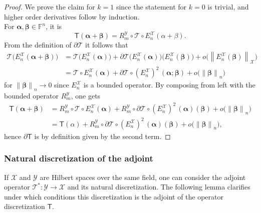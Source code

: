 \documentclass[a4paper]{paper}
\newcommand{\Spc}[1]{\mathscr{#1}}
\newcommand{\Field}{\mathbb{F}}
\newcommand{\Op}[1]{\mathcal{#1}}
\newcommand{\DiscOp}[1]{\mathsf{#1}}
\newcommand*{\EXT}[2]{\ensuremath{E_{#1}^{#2}}}
\newcommand*{\REST}[2]{\ensuremath{R_{#1}^{#2}}}
\newcommand*{\RmY}{\ensuremath{\REST{m}{\Spc{Y}}}}
\newcommand*{\EnX}{\ensuremath{\EXT{n}{\Spc{X}}}}
\newcommand*{\NORM}[1]{\ensuremath{\lVert #1 \rVert}}
\newcommand*{\NORMLR}[1]{\ensuremath{\left\lVert #1 \right\rVert}}
\newcommand{\valpha}{\boldsymbol{\alpha}}
\newcommand{\vbeta}{\boldsymbol{\beta}}
\begin{document}
\begin{proof}
 We prove the claim for $k=1$ since the statement for $k=0$ is trivial, and higher order derivatives follow by 
 induction.\\
 For $\valpha,\vbeta \in \Field^n$, it is
 \begin{equation*}
  \DiscOp{T}(\valpha + \vbeta) = \RmY \circ \Op{T} \circ \EnX (\alpha + \beta).
 \end{equation*}
 From the definition of $\partial \Op{T}$ it follows that
 \begin{align*}
  \Op{T}\big(\EnX(\valpha + \vbeta)\big)
  &= \Op{T}\big(\EnX(\valpha)\big) + \partial\Op{T}\big(\EnX(\valpha)\big)\big(\EnX(\vbeta)\big) +
  o\big(\NORMLR{\EnX(\vbeta)}_{\Spc{X}}\big) \\
  &= \Op{T} \circ \EnX(\valpha) + \partial\Op{T}\circ (\EnX)^2\,(\valpha; \vbeta) + o\big(\NORM{\vbeta}_n \big)
 \end{align*}
 for $\NORM{\vbeta}_n \to 0$ since $\EnX$ is a bounded operator. By composing from left with the bounded operator 
 $\RmY$, one gets
 \begin{align*}
  \DiscOp{T}(\valpha + \vbeta)
  &= \RmY \circ \Op{T} \circ \EnX(\valpha) + \RmY \circ \partial\Op{T}\circ (\EnX)^2\,(\valpha)(\vbeta) +
  o\big(\NORM{\vbeta}_n \big) 
  \\
  &= \DiscOp{T}(\alpha) + \RmY \circ \partial\Op{T}\circ (\EnX)^2\,(\valpha)(\vbeta) + o\big(\NORM{\vbeta}_n \big),
 \end{align*}
 hence $\partial\DiscOp{T}$ is by definition given by the second term.
\end{proof}


\subsubsection{Natural discretization of the adjoint}
\label{subsubsec:discr:operator:op_adj}

If $\Spc{X}$ and $\Spc{Y}$ are Hilbert spaces over the same field, one can consider the adjoint operator 
$\Op{T}^* \colon \Spc{Y} \to \Spc{X}$ and its natural discretization. The following lemma clarifies under which 
conditions this discretization is the adjoint of the operator discretization $\DiscOp{T}$.
\end{document}
